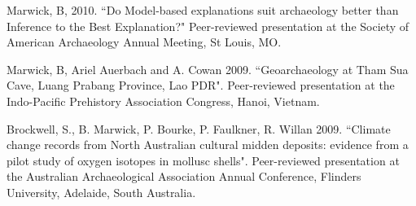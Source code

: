 \ind Marwick, B, 2010. ``Do Model-based explanations suit archaeology better than Inference to the Best Explanation?" Peer-reviewed presentation at the Society of American Archaeology Annual Meeting, St Louis, MO.

\ind Marwick, B, Ariel Auerbach and A. Cowan 2009. ``Geoarchaeology at Tham Sua Cave, Luang Prabang Province, Lao PDR". Peer-reviewed presentation at the Indo-Pacific Prehistory Association Congress, Hanoi, Vietnam.

\ind Brockwell, S., B. Marwick, P. Bourke, P. Faulkner, R. Willan 2009. ``Climate change records from North Australian cultural midden deposits: evidence from a pilot study of oxygen isotopes in mollusc shells". Peer-reviewed presentation  at the Australian Archaeological Association Annual Conference, Flinders University, Adelaide, South Australia.






 \bigskip



